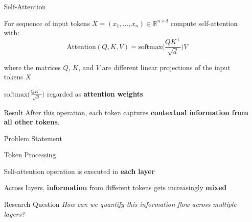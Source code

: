 \documentclass[xcolor=table]{beamer} %
\begin{document}
\begin{frame}{Self-Attention}
    \pause
    \begin{itemize}
        {\large 
        \item For sequence of input tokens $X = (x_1, \ldots, x_n) \in \mathbb{R}^{n \times d}$ compute self-attention with: \pause
        \vspace{0.5em}
        \[
            \text{Attention}(Q,K,V) = \text{softmax}\Big(\frac{Q K^\top}{\sqrt{d}}\Big) V
        \]

        \vspace{0.5em} \pause

        where the matrices $Q$, $K$, and $V$ are different linear projections of the input tokens $X$ \pause
        \vspace{1.0em} 
        \item $\text{softmax}\Big(\frac{Q K^\top}{\sqrt{d}}\Big)$ regarded as \textbf{attention weights}
        }  \pause
    \end{itemize}
    \vspace{1.5em}

    \begin{block}{\large Result}
        {\large After this operation, each token captures \textbf{contextual information from all other tokens}.
        }
    \end{block}
\end{frame}

\begin{frame}{Problem Statement}
    \pause
    \begin{block}{\large Token Processing }
        \pause
        \begin{itemize}
            {\large
            \item Self-attention operation is executed in \textbf{each layer} \pause
            \vspace{0.25em}
            \item Across layers, \textbf{information} from different tokens gets increasingly \textbf{mixed} \pause
            }
        \end{itemize}


    \end{block}

    \vspace{1.5em}

    \begin{block}{\large Research Question}
        \pause
        \large \textit{How can we quantify this information flow across multiple layers?}
    \end{block}
\end{frame}
\end{document}
